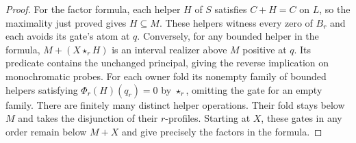 \begin{proof}
For the factor formula, each helper $H$ of $S$ satisfies
$C+H=C$ on $L$, so the maximality just proved gives $H\subseteq M$.
These helpers witness every zero of $B_r$ and each avoids its gate's
atom at $q$. Conversely, for any bounded helper in the formula,
$M+(X\star_r H)$ is an interval realizer above $M$ positive at $q$.
Its predicate contains the unchanged principal, giving the reverse
implication on monochromatic probes.
For each owner fold its nonempty family of bounded helpers satisfying
$\Phi_r(H)(q_r)=0$ by $\star_r$, omitting the gate for an empty
family. There are finitely many distinct helper operations. Their
fold stays below $M$ and takes the disjunction of their $r$-profiles.
Starting at $X$, these gates in any order remain below $M+X$ and
give precisely the factors in the formula.
\end{proof}

